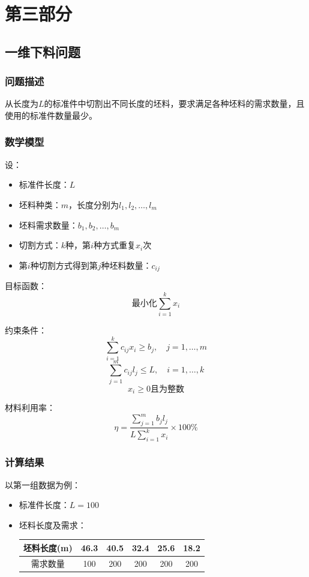 \documentclass[fontset=windows,openright]{ctexrep}
\begin{document}
\chapter{第三部分}
\section{一维下料问题}

\subsection{问题描述}
从长度为$L$的标准件中切割出不同长度的坯料，要求满足各种坯料的需求数量，且使用的标准件数量最少。

\subsection{数学模型}
设：
\begin{itemize}
    \item 标准件长度：$L$
    \item 坯料种类：$m$，长度分别为$l_1, l_2, \ldots, l_m$
    \item 坯料需求数量：$b_1, b_2, \ldots, b_m$
    \item 切割方式：$k$种，第$i$种方式重复$x_i$次
    \item 第$i$种切割方式得到第$j$种坯料数量：$c_{ij}$
\end{itemize}

目标函数：
\[ \text{最小化} \sum_{i=1}^k x_i \]

约束条件：
\[ \sum_{i=1}^k c_{ij} x_i \geq b_j, \quad j=1,\ldots,m \]
\[ \sum_{j=1}^m c_{ij} l_j \leq L, \quad i=1,\ldots,k \]
\[ x_i \geq 0 \text{且为整数} \]

材料利用率：
\[ \eta = \frac{\sum_{j=1}^m b_j l_j}{L \sum_{i=1}^k x_i} \times 100\% \]

\subsection{计算结果}
以第一组数据为例：
\begin{itemize}
    \item 标准件长度：$L=100$
    \item 坯料长度及需求：
    \begin{tabular}{|c|c|c|c|c|c|}
        \hline
        坯料长度(m) & 46.3 & 40.5 & 32.4 & 25.6 & 18.2 \\
        \hline
        需求数量 & 100 & 200 & 200 & 200 & 200 \\
        \hline
    \end{tabular}
\end{itemize}
\end{document}
